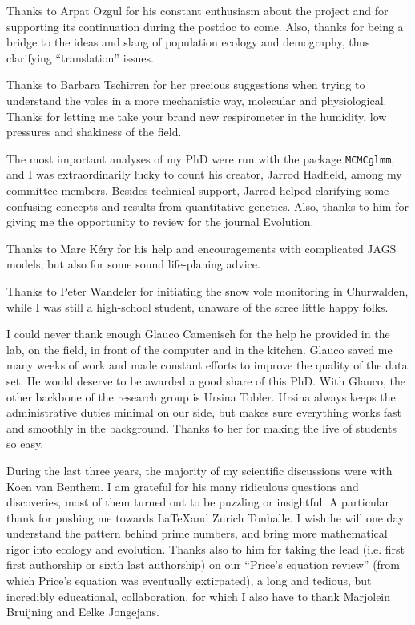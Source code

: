 Thanks to Arpat Ozgul for his constant enthusiasm about the project and for supporting its continuation during the postdoc to come. Also, thanks for being a bridge to the ideas and slang of population ecology and demography, thus clarifying ``translation'' issues. 

Thanks to Barbara Tschirren for her precious suggestions when trying to understand the voles in a more mechanistic way, molecular and physiological. Thanks for letting me take your brand new respirometer in the humidity, low pressures and shakiness of the field. 

The most important analyses of my PhD were run with the package \texttt{MCMCglmm}, and I was extraordinarily lucky to count his creator, Jarrod Hadfield, among my committee members. Besides technical support, Jarrod helped clarifying some confusing concepts and results from quantitative genetics. Also, thanks to him for giving me the opportunity to review for the journal Evolution. 

Thanks to Marc K\'{e}ry for his help and encouragements with complicated JAGS models, but also for some sound life-planing advice. 

Thanks to Peter Wandeler for initiating the snow vole monitoring in Churwalden, while I was still a high-school student, unaware of the scree little happy folks. 

I could never thank enough Glauco Camenisch for the help he provided in the lab, on the field, in front of the computer and in the kitchen. Glauco saved me many weeks of work and made constant efforts to improve the quality of the data set. He would deserve to be awarded a good share of this PhD.
With Glauco, the other backbone of the research group is Ursina Tobler. 
Ursina always keeps the administrative duties minimal on our side, but makes sure everything works fast and smoothly in the background. Thanks to her for making the live of students so easy. 

During the last three years, the majority of my scientific discussions were with Koen van Benthem. I am grateful for his many ridiculous questions and discoveries, most of them turned out to be puzzling or insightful. A particular thank for pushing me towards \LaTeX and Zurich Tonhalle. 
I wish he will one day understand the pattern behind prime numbers, and bring more mathematical rigor into ecology and evolution. 
Thanks also to him for taking the lead (i.e. first first authorship or sixth last authorship) on our ``Price's equation review'' (from which Price's equation was eventually extirpated), a long and tedious, but incredibly educational, collaboration, for which I also have to thank Marjolein Bruijning and Eelke Jongejans.

